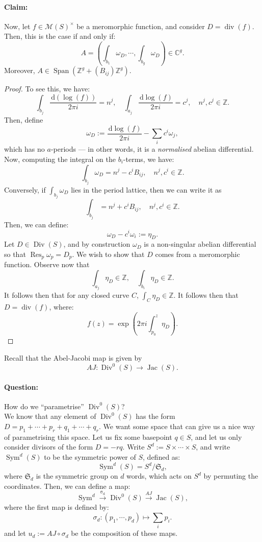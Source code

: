 \documentclass[a4paper]{report}
\theoremstyle{definition}
\theoremstyle{remark}
\theoremstyle{proposition}
\theoremstyle{conjecture}
\theoremstyle{lemma}
\theoremstyle{corollary}
\theoremstyle{exercise}
\theoremstyle{example}
\newcommand{\C}{\mathbb{C}}
\newcommand{\mcal}{\mathcal}
\newcommand{\diff}{\,\mathrm{d}}
\newcommand{\on}{\operatorname}
\begin{document}
\paragraph{Claim:} Now, let $f\in \mcal{M}(S)^\times$ be a meromorphic function, and consider $D = \on{div}(f)$. 
Then, this is the case if and only if:
$$A = \left(\int_{b_1}\omega_D,\cdots,\int_{b_g}\omega_D\right) \in \C^g.$$
Moreover, $A \in \on{Span}(\mathbb{Z}^g + (B_{ij})\mathbb{Z}^g)$.
\begin{proof}
    To see this, we have:
    $$\int_{b_j}\frac{\diff(\log(f))}{2\pi i} =  n^j,\quad \int_{a_j}\frac{\diff\log(f)}{2\pi i} = c^j,\quad n^j,c^j \in \mathbb{Z}.$$
    Then, define 
    $$\omega_D := \frac{\diff \log(f)}{2\pi i} - \sum_ic^i\omega_j,$$
    which has no $a$-periods --- in other words, it is a \emph{normalised} 
    abelian differential.
    Now, computing the integral on the $b_i$-terms, we have:
    $$\int_{b_j} \omega_D = n^j - c^iB_{ij},\quad n^j,c^i\in\mathbb{Z}.$$
    Conversely, if $\int_{b_j}\omega_D$ lies in the period lattice,
    then we can write it as 
    $$\int_{b_j} = n^j + c^iB_{ij},\quad n^j,c^i \in \mathbb{Z}.$$
    Then, we can define:
    $$\omega_D - c^i\omega_i := \eta_D.$$
    Let $D \in \on{Div}(S)$, and by construction $\omega_D$ is a non-singular 
    abelian differential so that $\on{Res}_p\omega_p = D_p$.
    We wish to show that $D$ comes from a meromorphic function.
    Observe now that 
    $$\int_{a_j}\eta_D \in \mathbb{Z},\quad \int_{b_i} \eta_D \in \mathbb{Z}.$$
    It follows then that for any closed curve $C$, 
    $\int_C \eta_D \in \mathbb{Z}$.
    It follows then that $D = \on{div}(f)$, where:
    $$f(z) = \exp\left(2\pi i\int_{p_0}^z \eta_D\right).$$
\end{proof}

Recall that the Abel-Jacobi map is given by 
$$AJ : \on{Div}^0(S) \longrightarrow \on{Jac}(S).$$
\paragraph{Question:} How do we ``parametrise'' $\on{Div}^0(S)$?\\
We know that any element of $\on{Div}^0(S)$ has the form 
$D = p_1 + \cdots + p_r + q_1 + \cdots + q_r$. We want some space that can 
give us a nice way of parametrising this space. 
Let us fix some basepoint $q\in S$, and let us only consider divisors of the 
form $D = -rq$. Write $S^d := S\times \cdots \times S$, and 
write $\on{Sym}^d(S)$ to be the symmetric power of $S$, defined as:
$$\on{Sym}^d(S) = S^d/\mathfrak{S}_d,$$
where $\mathfrak{S}_d$ is the symmetric group on $d$ words, which acts on 
$S^d$ by permuting the coordinates.
Then, we can define a map:
        $$\on{Sym}^d \stackrel{\on{\sigma_d}}{\longrightarrow} \on{Div}^0(S) \stackrel{AJ}{\longrightarrow} \on{Jac}(S),$$
where the first map is defined by:
$$\sigma_d : (p_1,\cdots,p_d) \longmapsto \sum_ip_i.$$
and let $u_d := AJ \circ \sigma_d$ be the composition of these maps.
\end{document}
